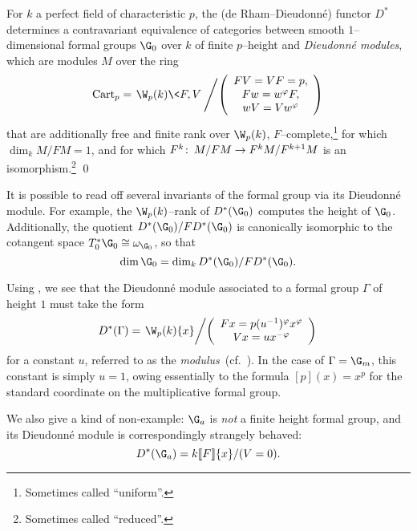 \begin{theorem}\label{MainContraDieudonneThm}
For \(k\) a perfect field of characteristic \(p\), the (de Rham--Dieudonn\'e) functor \(D^*\) determines a contravariant equivalence of categories between smooth \(1\)--dimensional formal groups \(\G_0\) over \(k\) of finite \(p\)--height and \textit{Dieudonn\'e modules}, which are modules \(M\) over the ring \[\Cart_p = \left. \W_p(k)\<F,V\> \middle/ \left( \begin{array}{c} FV = VF = p, \\ Fw = w^\phi F, \\ wV = Vw^\phi \end{array} \right) \right.\] that are additionally free and finite rank over \(\W_p(k)\), \(F\)--complete,\footnote{Sometimes called ``uniform''.} for which \(\dim_k M / FM = 1\), and for which \(F^k\colon\thinspace M / FM \to F^kM / F^{k+1}M\) is an isomorphism.\footnote{Sometimes called ``reduced''.} \qed
\end{theorem}

\begin{remark}\label{InvariantsFromDModule}
It is possible to read off several invariants of the formal group via its Dieudonn\'e module.  For example, the \(\W_p(k)\)--rank of \(D^*(\G_0)\) computes the height of \(\G_0\).  Additionally, the quotient \(D^*(\G_0) / FD^*(\G_0)\) is canonically isomorphic to the cotangent space \(T_0^* \G_0 \cong \omega_{\G_0}\), so that \[\dim \G_0 = \dim_k D^*(\G_0) / FD^*(\G_0).\]
\end{remark}

\begin{example}
Using , we see that the Dieudonn\'e module associated to a formal group \(\Gamma\) of height \(1\) must take the form \[D^*(\Gamma) = \left. \W_p(k)\{x\} \middle/ \left( \begin{array}{c} Fx = p (u^{-1})^\phi x^\phi \\ Vx = u x^{-\phi} \end{array} \right)\right.\] for a constant \(u\), referred to as the \textit{modulus}~(cf.\ \cite[Theorem 4.2.2]{MoravaFormsOfKthy}).  In the case of \(\Gamma = \G_m\), this constant is simply \(u = 1\), owing essentially to the formula \([p](x) = x^p\) for the standard coordinate on the multiplicative formal group.
\end{example}

\begin{example}
We also give a kind of non-example: \(\G_a\) is \emph{not} a finite height formal group, and its Dieudonn\'e module is correspondingly strangely behaved: \[D^*(\G_a) = k\ps{F}\{x\} / (V = 0).\]
\end{example}

